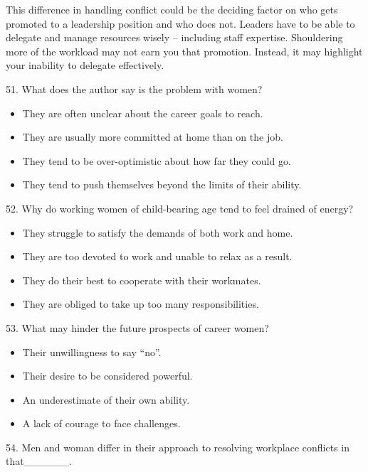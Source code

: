\documentclass[UTF8,11pt]{ctexart}
\begin{document}
This difference in handling conflict could be the deciding factor on who gets promoted to a leadership position and who does not. Leaders have to be able to delegate and manage resources wisely – including staff expertise. Shouldering more of the workload may not earn you that promotion. Instead, it may highlight your inability to delegate effectively.


51. What does the author say is the problem with women?


\begin{itemize}[leftmargin=2em,itemsep=.2em,topsep=.4em]\item[A.] They are often unclear about the career goals to reach.
\item[B.] They are usually more committed at home than on the job.
\item[C.] They tend to be over-optimistic about how far they could go.
\item[D.] They tend to push themselves beyond the limits of their ability.
\end{itemize}

52. Why do working women of child-bearing age tend to feel drained of energy?


\begin{itemize}[leftmargin=2em,itemsep=.2em,topsep=.4em]\item[A.] They struggle to satisfy the demands of both work and home.
\item[B.] They are too devoted to work and unable to relax as a result.
\item[C.] They do their best to cooperate with their workmates.
\item[D.] They are obliged to take up too many responsibilities.
\end{itemize}

53. What may hinder the future prospects of career women?


\begin{itemize}[leftmargin=2em,itemsep=.2em,topsep=.4em]\item[A.] Their unwillingness to say “no”.
\item[B.] Their desire to be considered powerful.
\item[C.] An underestimate of their own ability.
\item[D.] A lack of courage to face challenges.
\end{itemize}

54. Men and woman differ in their approach to resolving workplace conflicts in that\_\_\_\_\_\_.
\end{document}
